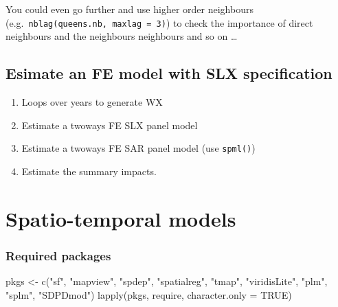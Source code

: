 \documentclass[
  letterpaper,
  DIV=11,
  numbers=noendperiod]{scrreprt}
\newenvironment{Shaded}{\begin{snugshade}}{\end{snugshade}}
\newcommand{\AttributeTok}[1]{\textcolor[rgb]{0.40,0.45,0.13}{#1}}
\newcommand{\ConstantTok}[1]{\textcolor[rgb]{0.56,0.35,0.01}{#1}}
\newcommand{\FunctionTok}[1]{\textcolor[rgb]{0.28,0.35,0.67}{#1}}
\newcommand{\NormalTok}[1]{\textcolor[rgb]{0.00,0.23,0.31}{#1}}
\newcommand{\OtherTok}[1]{\textcolor[rgb]{0.00,0.23,0.31}{#1}}
\newcommand{\StringTok}[1]{\textcolor[rgb]{0.13,0.47,0.30}{#1}}
\begin{document}
You could even go further and use higher order neighbours
(e.g.~\texttt{nblag(queens.nb,\ maxlag\ =\ 3)}) to check the importance
of direct neighbours and the neighbours neighbours and so on \ldots{}

\hypertarget{esimate-an-fe-model-with-slx-specification}{%
\section{Esimate an FE model with SLX
specification}\label{esimate-an-fe-model-with-slx-specification}}

\begin{enumerate}
\def\labelenumi{\alph{enumi})}
\item
  Loops over years to generate WX
\item
  Estimate a twoways FE SLX panel model
\item
  Estimate a twoways FE SAR panel model (use \texttt{spml()})
\item
  Estimate the summary impacts.
\end{enumerate}


\hypertarget{spatio-temporal-models}{%
\chapter{Spatio-temporal models}\label{spatio-temporal-models}}

\newcommand{\Exp}{\mathrm{E}}
\newcommand\given[1][]{\:#1\vert\:}
\newcommand{\Cov}{\mathrm{Cov}}
\newcommand{\Var}{\mathrm{Var}}
\newcommand{\rank}{\mathrm{rank}}
\newcommand{\bm}[1]{\boldsymbol{\mathbf{#1}}}
\newcommand{\Prob}{\mathrm{Prob}}

\hypertarget{required-packages-11}{%
\subsection*{Required packages}\label{required-packages-11}}

\begin{Shaded}
\begin{Highlighting}[]
\NormalTok{pkgs }\OtherTok{\textless{}{-}} \FunctionTok{c}\NormalTok{(}\StringTok{"sf"}\NormalTok{, }\StringTok{"mapview"}\NormalTok{, }\StringTok{"spdep"}\NormalTok{, }\StringTok{"spatialreg"}\NormalTok{, }\StringTok{"tmap"}\NormalTok{, }\StringTok{"viridisLite"}\NormalTok{, }
          \StringTok{"plm"}\NormalTok{, }\StringTok{"splm"}\NormalTok{, }\StringTok{"SDPDmod"}\NormalTok{)}
\FunctionTok{lapply}\NormalTok{(pkgs, require, }\AttributeTok{character.only =} \ConstantTok{TRUE}\NormalTok{)}
\end{Highlighting}
\end{Shaded}
\end{document}

